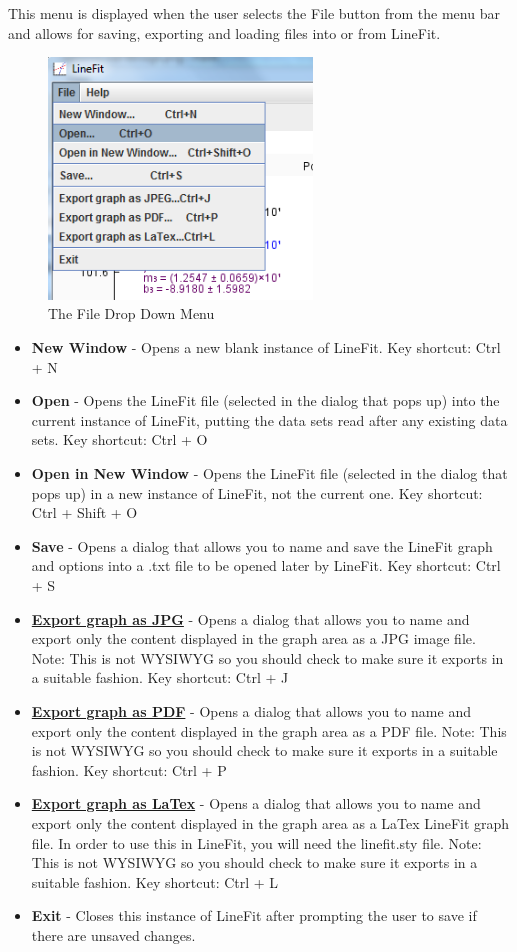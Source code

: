 \documentclass[titlepage,12pt]{article}
\begin{document}
This menu is displayed when the user selects the File button from the menu bar and allows for saving, exporting and loading files into or from LineFit.

\begin{figure}[ht!]
\centering
\includegraphics[width=7cm]{images/FileMenu.png}
\caption{The File Drop Down Menu}
\end{figure}

\begin{itemize}
\item \textbf{New Window} - Opens a new blank instance of LineFit. Key shortcut: Ctrl + N
\item \textbf{Open} - Opens the LineFit file (selected in the dialog that pops up) into the current instance of LineFit, putting the data sets read after any existing data sets. Key shortcut: Ctrl + O
\item \textbf{Open in New Window} - Opens the LineFit file (selected in the dialog that pops up) in a new instance of LineFit, not the current one. Key shortcut: Ctrl + Shift + O
\item \textbf{Save} - Opens a dialog that allows you to name and save the LineFit graph and options into a .txt file to be opened later by LineFit. Key shortcut: Ctrl + S
\item \hyperref[sec:exportjpg]{\textbf{Export graph as JPG}} - Opens a dialog that allows you to name and export only the content displayed in the graph area as a JPG image file. Note: This is not WYSIWYG so you should check to make sure it exports in a suitable fashion. Key shortcut: Ctrl + J
\item \hyperref[sec:exportpdf]{\textbf{Export graph as PDF}} - Opens a dialog that allows you to name and export only the content displayed in the graph area as a PDF file. Note: This is not WYSIWYG so you should check to make sure it exports in a suitable fashion. Key shortcut: Ctrl + P
\item \hyperref[sec:exportlatex]{\textbf{Export graph as LaTex}} - Opens a dialog that allows you to name and export only the content displayed in the graph area as a LaTex LineFit graph file. In order to use this in LineFit, you will need the linefit.sty file. Note: This is not WYSIWYG so you should check to make sure it exports in a suitable fashion. Key shortcut: Ctrl + L
\item \textbf{Exit} - Closes this instance of LineFit after prompting the user to save if there are unsaved changes.
\end{itemize}
\end{document}
